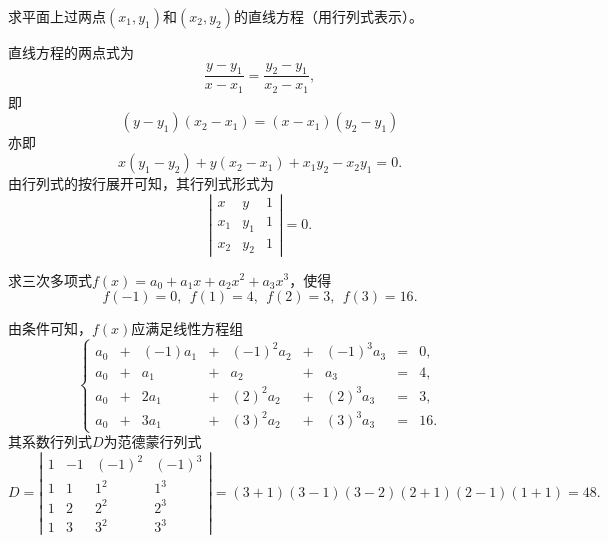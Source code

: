 \begin{frame}
  \begin{footnotesize}
    \begin{exampleblock}{34}
      求平面上过两点$(x_1,y_1)$和$(x_2,y_2)$的直线方程（用行列式表示）。
    \end{exampleblock}
    \pause
    \jiename
    直线方程的两点式为
    $$
    \frac{y-y_1}{x-x_1}=\frac{y_2-y_1}{x_2-x_1},
    $$
    \pause 
    即
    $$
    (y-y_1)(x_2-x_1)=(x-x_1)(y_2-y_1)
    $$
    亦即
    $$
    x(y_1-y_2)+y(x_2-x_1)+x_1y_2-x_2y_1=0.
    $$
    \pause 
    由行列式的按行展开可知，其行列式形式为
    $$
    \left|
    \begin{array}{ccc}
      x&y&1\\
      x_1&y_1&1\\
      x_2&y_2&1      
    \end{array}
    \right|=0.
    $$
  \end{footnotesize}
\end{frame}


\begin{frame}
  \begin{footnotesize}
    \begin{exampleblock}{35}
      求三次多项式$f(x)=a_0+a_1x+a_2x^2+a_3x^3$，使得
      $$
      f(-1)=0,~~f(1)=4,~~f(2)=3,~~f(3)=16.
      $$
    \end{exampleblock}
    \pause
    \jiename
    由条件可知，$f(x)$应满足线性方程组
    $$
    \left\{
    \begin{array}{rcrcrcrcrcr}
      a_0&+&(-1)a_1&+&(-1)^2a_2&+&(-1)^3a_3&=&0, \\[0.2cm]
      a_0&+&    a_1&+&      a_2&+&      a_3&=&4, \\[0.2cm]
      a_0&+&  2 a_1&+&( 2)^2a_2&+&( 2)^3a_3&=&3, \\[0.2cm]
      a_0&+&  3 a_1&+&( 3)^2a_2&+&( 3)^3a_3&=&16.
    \end{array}
    \right.
    $$
    \pause
    其系数行列式$D$为范德蒙行列式
    $$
    D = \left|
    \begin{array}{cccc}
      1& -1&(-1)^2&(-1)^3\\[0.1cm]
      1&  1&   1^2&1^3\\[0.1cm]
      1&  2&   2^2&2^3\\[0.1cm]
      1&  3&   3^2&3^3
    \end{array}
    \right| 
    = (3+1)(3-1)(3-2)(2+1)(2-1)(1+1) = 48.
    $$
  \end{footnotesize}
\end{frame}

